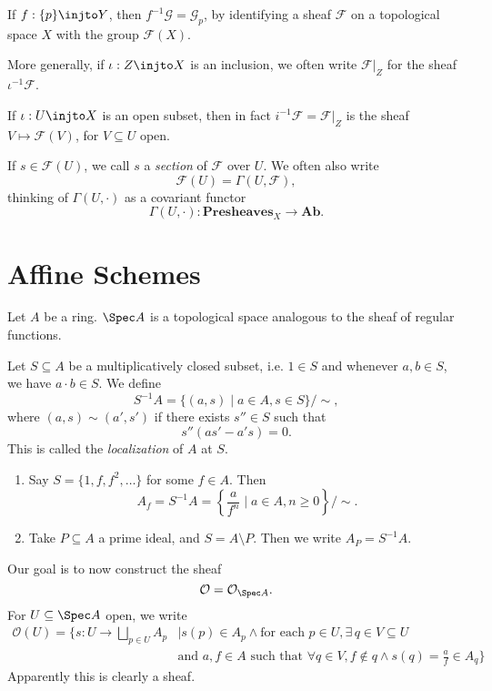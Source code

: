 \documentclass[12pt]{article}
\begin{document}
\begin{exbox}
	If $f : \{p\} \injto Y$, then $f^{-1} \mathcal{G} = \mathcal{G}_p$, by identifying a sheaf $\mathcal{F}$ on a topological space $X$ with the group $\mathcal{F}(X)$.

	More generally, if $\iota : Z \injto X$ is an inclusion, we often write $\mathcal{F}|_Z$ for the sheaf $\iota^{-1} \mathcal{F}$.

	If $\iota : U \injto X$ is an open subset, then in fact $i^{-1} \mathcal{F} = \mathcal{F}|_Z$ is the sheaf $V \mapsto \mathcal{F}(V)$, for $V \subseteq U$ open.
\end{exbox}

If $s \in \mathcal{F}(U)$, we call $s$ a \emph{section} of $\mathcal{F}$ over $U$. We often also write
\[
\mathcal{F}(U) = \Gamma(U, \mathcal{F}),
\]
thinking of $\Gamma(U, \cdot)$ as a covariant functor
\[
\Gamma(U, \cdot) : \mathbf{Presheaves}_X \to \mathbf{Ab}.
\]

\newpage

\section{Affine Schemes}%
\label{sec:as}

Let $A$ be a ring. $\Spec A$ is a topological space analogous to the sheaf of regular functions.

Let $S \subseteq A$ be a multiplicatively closed subset, i.e. $1 \in S$ and whenever $a, b \in S$, we have $a \cdot b \in S$. We define
\[
	S^{-1}A = \{(a, s) \mid a \in A, s \in S\} / \sim,
\]
where $(a, s) \sim (a', s')$ if there exists $s'' \in S$ such that
\[
s''(as' - a's) = 0.
\]
This is called the \emph{localization} of $A$ at $S$.

\begin{exbox}
	\begin{enumerate}
		\item Say $S = \{1, f, f^2, \ldots\}$ for some $f \in A$. Then
			\[
				A_f = S^{-1} A = \left\{ \frac{a}{f^n} \mid a \in A, n \geq 0\right\} / \sim.
			\]
		\item Take $P \subseteq A$ a prime ideal, and $S = A \setminus P$. Then we write $A_P = S^{-1} A$.
	\end{enumerate}
\end{exbox}

Our goal is to now construct the sheaf
\[
\mathcal{O} = \mathcal{O}_{\Spec A}.
\]
For $U \subseteq \Spec A$ open, we write
\begin{align*}
	\mathcal{O}(U) = \biggl\{ s : U \to \bigsqcup_{p \in U} A_p &\mid s(p) \in A_p \wedge \text{for each } p \in U, \exists \, q \in V \subseteq U \\
								    & \text{and }a, f \in A \text{ such that } \forall q \in V, f \not \in q \wedge s(q) = \frac{a}{f} \in A_q \biggr\}
\end{align*}
Apparently this is clearly a sheaf.


\newpage

\printindex
\end{document}
